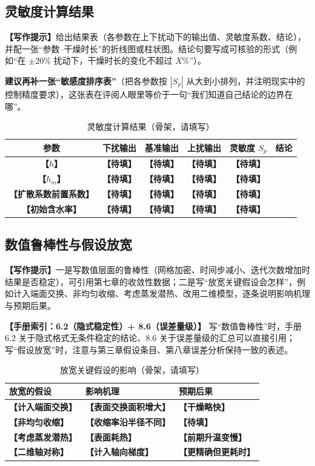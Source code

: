 \documentclass[12pt,a4paper]{article}
\newcommand{\prompt}[1]{\par\noindent\textbf{【写作提示】}#1\par}      %
\newcommand{\ph}[1]{\textbf{【#1】}}                                   %
\newcommand{\handbook}[2]{\par\noindent\textbf{【手册索引：#1】} #2\par}
\begin{document}
\subsection{灵敏度计算结果}

\prompt{给出结果表（各参数在上下扰动下的输出值、灵敏度系数、结论），并配一张“参数–干燥时长”的折线图或柱状图。结论句要写成可核验的形式（例如“在 $\pm20\%$ 扰动下，干燥时长的变化不超过 $X\%$”）。

\textbf{建议再补一张“敏感度排序表”}（把各参数按 $|S_p|$ 从大到小排列，并注明现实中的控制精度要求），这张表在评阅人眼里等价于一句“我们知道自己结论的边界在哪”。}

\begin{table}[H]
\centering
\caption{灵敏度计算结果（骨架，请填写）}
\label{tab:sensitivity-result}
\begin{tabular}{cccccc}
\toprule
参数 & 下扰输出 & 基准输出 & 上扰输出 & 灵敏度 $S_p$ & 结论\\
\midrule
\ph{$h$} & \ph{待填} & \ph{待填} & \ph{待填} & \ph{待填} & \\
\ph{$h_m$} & \ph{待填} & \ph{待填} & \ph{待填} & \ph{待填} & \\
\ph{扩散系数前置系数} & \ph{待填} & \ph{待填} & \ph{待填} & \ph{待填} & \\
\ph{初始含水率} & \ph{待填} & \ph{待填} & \ph{待填} & \ph{待填} & \\
\bottomrule
\end{tabular}
\end{table}

\subsection{数值鲁棒性与假设放宽}

\prompt{一是写数值层面的鲁棒性（网格加密、时间步减小、迭代次数增加时结果是否稳定），可引用第七章的收敛性数据；二是写“放宽关键假设会怎样”，例如计入端面交换、非均匀收缩、考虑蒸发潜热、改用二维模型，逐条说明影响机理与预期后果。}

\handbook{6.2（隐式稳定性）+ 8.6（误差量级）}{写“数值鲁棒性”时，手册 6.2 关于隐式格式无条件稳定的结论、8.6 关于误差量级的汇总可以直接引用；写“假设放宽”时，注意与第三章假设条目、第八章误差分析保持一致的表述。}

\begin{table}[H]
\centering
\caption{放宽关键假设的影响（骨架，请填写）}
\label{tab:assumption-relax}
\begin{tabular}{p{3.6cm}p{6.2cm}p{4.4cm}}
\toprule
放宽的假设 & 影响机理 & 预期后果\\
\midrule
\ph{计入端面交换} & \ph{表面交换面积增大} & \ph{干燥略快}\\
\ph{非均匀收缩} & \ph{收缩率沿半径不同} & \ph{待填}\\
\ph{考虑蒸发潜热} & \ph{表面耗热} & \ph{前期升温变慢}\\
\ph{二维轴对称} & \ph{计入轴向梯度} & \ph{更精确但更耗时}\\
\bottomrule
\end{tabular}
\end{table}
\end{document}
